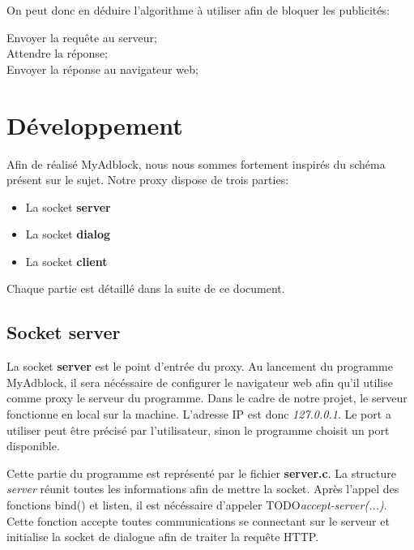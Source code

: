 \documentclass[a4paper,11pt, oneside]{book}
\def\appName{MyAdblock}
\def\todo{{\color{red}\Huge{TODO}}}
\begin{document}
		\clearpage
		On peut donc en déduire l'algorithme à utiliser afin de bloquer les publicités:\\

		\begin{algorithm}[H]
			{
				Envoyer la requête au serveur;\\
				Attendre la réponse;\\
				Envoyer la réponse au navigateur web;
			}
		\end{algorithm}


		\chapter{Développement}

			Afin de réalisé \appName, nous nous sommes fortement inspirés du schéma présent sur le sujet.
			Notre proxy dispose de trois parties:
			\begin{itemize}
				\item La socket \textbf{server}
				\item La socket \textbf{dialog}
				\item La socket \textbf{client}
			\end{itemize}

			Chaque partie est détaillé dans la suite de ce document.


		\section{Socket server}

			La socket \textbf{server} est le point d'entrée du proxy. Au lancement du programme \appName,
			il sera nécéssaire de configurer le navigateur web afin qu'il utilise comme proxy le serveur du programme.
			Dans le cadre de notre projet, le serveur fonctionne en local sur la machine. L'adresse IP est donc \textit{127.0.0.1}. Le port
			a utiliser peut être précisé par l'utilisateur, sinon le programme choisit un port disponible.

			Cette partie du programme est représenté par le fichier \textbf{server.c}. La structure \textit{server} réunit toutes les informations
			afin de mettre la socket. Après l'appel des fonctions bind() et listen, il est nécéssaire
			d'appeler \todo \textit{accept-server(...)}. Cette fonction accepte toutes communications se connectant sur le serveur
			et initialise la socket de dialogue afin de traiter la requête HTTP.
\end{document}
